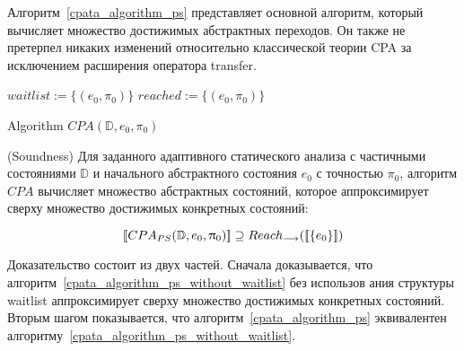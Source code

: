 Алгоритм~\ref{cpata_algorithm_ps} представляет основной алгоритм, который вычисляет множество достижимых абстрактных переходов.
Он также не претерпел никаких изменений относительно классической теории CPA за исключением расширения оператора transfer.
 
\begin{algorithm}
 $waitlist := \{(e_0, \pi_0)\}$\;
 $reached := \{(e_0, \pi_0)\}$\;


 \caption{Algorithm $CPA(\mathbb{D}, e_0, \pi_0)$}
 \label{cpata_algorithm_ps}
\end{algorithm} 
 
\begin{thrm}
\label{thrm_soundness}
(Soundness) Для заданного адаптивного статического анализа с частичными состояниями $\mathbb{D}$ и начального абстрактного состояния $e_0$ с точностью $\pi_0$, алгоритм $CPA$ вычисляет множество абстрактных состояний, которое аппроксимирует сверху множество достижимых конкретных состояний:

$$[\![ CPA_{PS}(\mathbb{D}, e_0, \uppi_0) ]\!] \supseteq Reach_{\longrightarrow}([\![ \{e_0\} ]\!])$$

\end{thrm}

Доказательство состоит из двух частей. Сначала доказывается, что алгоритм~\ref{cpata_algorithm_ps_without_waitlist} без использов
ания структуры waitlist аппроксимирует сверху множество достижимых конкретных состояний. Вторым шагом показывается, что алгоритм~\ref{cpata_algorithm_ps} эквивалентен алгоритму~\ref{cpata_algorithm_ps_without_waitlist}.

